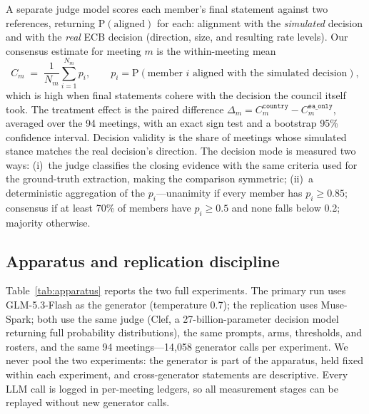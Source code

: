 \documentclass[11pt,a4paper]{article}
\begin{document}
A separate judge model scores each member's final statement against two references, returning $\text{P}(\text{aligned})$ for each: alignment with the \emph{simulated} decision and with the \emph{real} ECB decision (direction, size, and resulting rate levels). Our consensus estimate for meeting $m$ is the within-meeting mean
\[
C_m \;=\; \frac{1}{N_m} \sum_{i=1}^{N_m} p_i, \qquad p_i = \text{P}(\text{member } i \text{ aligned with the simulated decision}),
\]
which is high when final statements cohere with the decision the council itself took. The treatment effect is the paired difference $\Delta_m = C_m^{\texttt{country}} - C_m^{\texttt{ea\_only}}$, averaged over the 94 meetings, with an exact sign test and a bootstrap 95\% confidence interval. Decision validity is the share of meetings whose simulated stance matches the real decision's direction. The decision mode is measured two ways: (i)~the judge classifies the closing evidence with the same criteria used for the ground-truth extraction, making the comparison symmetric; (ii)~a deterministic aggregation of the $p_i$---unanimity if every member has $p_i \geq 0.85$; consensus if at least 70\% of members have $p_i \geq 0.5$ and none falls below 0.2; majority otherwise.

\subsection{Apparatus and replication discipline}\label{sec:apparatus}

Table~\ref{tab:apparatus} reports the two full experiments. The primary run uses GLM-5.3-Flash as the generator (temperature 0.7); the replication uses Muse-Spark; both use the same judge (Clef, a 27-billion-parameter decision model returning full probability distributions), the same prompts, arms, thresholds, and rosters, and the same 94 meetings---14,058 generator calls per experiment. We never pool the two experiments: the generator is part of the apparatus, held fixed within each experiment, and cross-generator statements are descriptive. Every LLM call is logged in per-meeting ledgers, so all measurement stages can be replayed without new generator calls.
\end{document}
